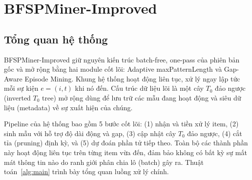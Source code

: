 \documentclass[conference]{IEEEtran}
\begin{document}
\section{BFSPMiner-Improved}
\label{sec:proposed}

\subsection{Tổng quan hệ thống}
BFSPMiner-Improved giữ nguyên kiến trúc batch-free, one-pass của phiên bản gốc và mở rộng bằng hai module cốt lõi: Adaptive maxPatternLength và Gap-Aware Episode Mining. Khung hệ thống hoạt động liên tục, xử lý ngay lập tức mỗi sự kiện $e = (i, t)$ khi nó đến. Cấu trúc dữ liệu lõi là một cây $T_0$ đảo ngược (inverted $T_0$ tree) mở rộng dùng để lưu trữ các mẫu đang hoạt động và siêu dữ liệu (metadata) về sự xuất hiện của chúng. 

Pipeline của hệ thống bao gồm 5 bước cốt lõi: (1) nhận và tiền xử lý item, (2) sinh mẫu với hỗ trợ độ dài động và gap, (3) cập nhật cây $T_0$ đảo ngược, (4) cắt tỉa (pruning) định kỳ, và (5) dự đoán phần tử tiếp theo. Toàn bộ các thành phần này hoạt động liên tục trên từng item vừa đến, đảm bảo không có bất kỳ sự mất mát thông tin nào do ranh giới phân chia lô (batch) gây ra. Thuật toán~\ref{alg:main} trình bày tổng quan luồng xử lý chính.
\end{document}
